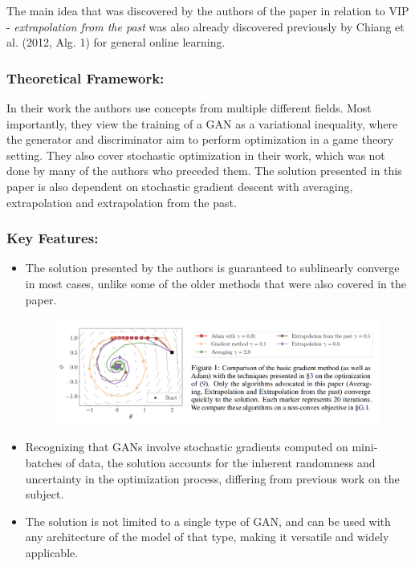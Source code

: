 \documentclass[11pt]{article}
\begin{document}
		The main idea that was discovered by the authors of the paper in relation to VIP - \textit{extrapolation from the past} was also already discovered previously by Chiang et al. (2012, Alg. 1) for general online learning.
		
		\subsubsection{Theoretical Framework:}
		In their work the authors use concepts from multiple different fields. Most importantly, they view the training of a GAN as a variational inequality, where the generator and discriminator aim to perform optimization in a game theory setting. They also cover stochastic optimization in their work, which was not done by many of the authors who preceded them. The solution presented in this paper is also dependent on stochastic gradient descent with averaging, extrapolation and extrapolation from the past.
		
		\subsubsection{Key Features:}
		\begin{itemize}
			\item The solution presented by the authors is guaranteed to sublinearly converge in most cases, unlike some of the older methods that were also covered in the paper.
			\begin{figure}[h]
				\centering
				\includegraphics[scale=0.7]{../../pictures/pic2.png}
				\label{fig:labe}
			\end{figure}
			\item Recognizing that GANs involve stochastic gradients computed on mini-batches of data, the solution accounts for the inherent randomness and uncertainty in the optimization process, differing from previous work on the subject.
			\item The solution is not limited to a single type of GAN, and can be used with any architecture of the model of that type, making it versatile and widely applicable.
		\end{itemize}
		
\end{document}
